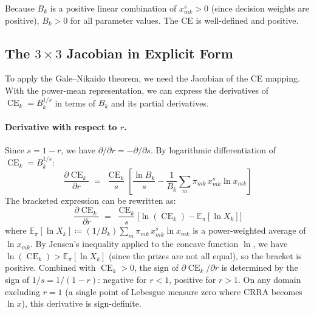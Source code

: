 \documentclass[11pt,a4paper]{article}
\theoremstyle{definition}
\newcommand{\E}{\mathbb{E}}
\DeclareMathOperator{\CE}{CE}
\begin{document}
Because $B_k$ is a positive linear combination of $x_{mk}^s > 0$
(since decision weights are positive), $B_k > 0$ for all parameter values.
The CE is well-defined and positive.

\subsection{The $3 \times 3$ Jacobian in Explicit Form}
\label{sec:explicit_jacobian}

To apply the Gale--Nikaido theorem, we need the Jacobian of the
CE mapping. With the power-mean representation, we can express the
derivatives of $\CE_k = B_k^{1/s}$ in terms of $B_k$ and its partial
derivatives.

\paragraph{Derivative with respect to $r$.}
Since $s = 1-r$, we have $\partial/\partial r = -\partial/\partial s$.
By logarithmic differentiation of $\CE_k = B_k^{1/s}$:
\begin{equation}
    \label{eq:dCE_dr}
    \frac{\partial \CE_k}{\partial r}
    \;=\; \frac{\CE_k}{s}
    \left[
        \frac{\ln B_k}{s}
        - \frac{1}{B_k}\sum_{m} \pi_{mk}\, x_{mk}^s \ln x_{mk}
    \right]
\end{equation}
The bracketed expression can be rewritten as:
\begin{equation}
    \frac{\partial \CE_k}{\partial r}
    \;=\; \frac{\CE_k}{s}
    \Big[\ln(\CE_k) - \E_\pi[\ln X_k]\Big]
\end{equation}
where $\E_\pi[\ln X_k] \coloneqq (1/B_k)\sum_m \pi_{mk}\, x_{mk}^s \ln x_{mk}$
is a power-weighted average of $\ln x_{mk}$.
By Jensen's inequality applied to the concave function $\ln$, we have
$\ln(\CE_k) > \E_\pi[\ln X_k]$ (since the prizes are not all equal),
so the bracket is positive. Combined with $\CE_k > 0$, the sign of
$\partial\CE_k/\partial r$ is determined by the sign of $1/s = 1/(1-r)$:
negative for $r < 1$, positive for $r > 1$.
On any domain excluding $r = 1$ (a single point of Lebesgue
measure zero where CRRA becomes $\ln x$), this derivative is
sign-definite.
\end{document}
